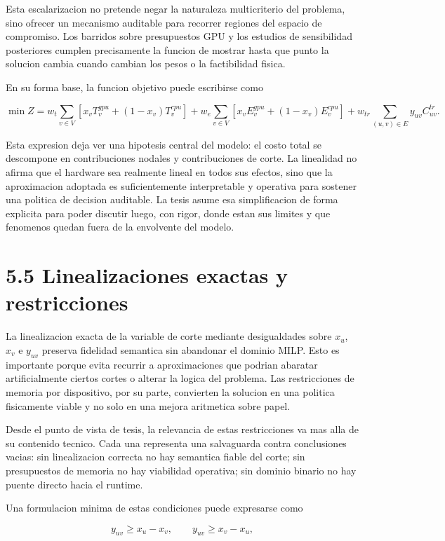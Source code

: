 Esta escalarizacion no pretende negar la naturaleza multicriterio del problema, sino ofrecer un mecanismo auditable para recorrer regiones del espacio de compromiso. Los barridos sobre presupuestos GPU y los estudios de sensibilidad posteriores cumplen precisamente la funcion de mostrar hasta que punto la solucion cambia cuando cambian los pesos o la factibilidad fisica.

En su forma base, la funcion objetivo puede escribirse como

$$
\min Z = w_t \sum_{v \in V}\left[x_v T^{gpu}_v + (1-x_v)T^{cpu}_v\right]
	+ w_e \sum_{v \in V}\left[x_v E^{gpu}_v + (1-x_v)E^{cpu}_v\right]
	+ w_{tr} \sum_{(u,v) \in E} y_{uv} C^{tr}_{uv}.
$$

Esta expresion deja ver una hipotesis central del modelo: el costo total se descompone en contribuciones nodales y contribuciones de corte. La linealidad no afirma que el hardware sea realmente lineal en todos sus efectos, sino que la aproximacion adoptada es suficientemente interpretable y operativa para sostener una politica de decision auditable. La tesis asume esa simplificacion de forma explicita para poder discutir luego, con rigor, donde estan sus limites y que fenomenos quedan fuera de la envolvente del modelo.

\section{5.5 Linealizaciones exactas y restricciones}
La linealizacion exacta de la variable de corte mediante desigualdades sobre $x_u$, $x_v$ e $y_{uv}$ preserva fidelidad semantica sin abandonar el dominio MILP. Esto es importante porque evita recurrir a aproximaciones que podrian abaratar artificialmente ciertos cortes o alterar la logica del problema. Las restricciones de memoria por dispositivo, por su parte, convierten la solucion en una politica fisicamente viable y no solo en una mejora aritmetica sobre papel.

Desde el punto de vista de tesis, la relevancia de estas restricciones va mas alla de su contenido tecnico. Cada una representa una salvaguarda contra conclusiones vacias: sin linealizacion correcta no hay semantica fiable del corte; sin presupuestos de memoria no hay viabilidad operativa; sin dominio binario no hay puente directo hacia el runtime.

Una formulacion minima de estas condiciones puede expresarse como

$$
y_{uv} \ge x_u - x_v, \qquad
y_{uv} \ge x_v - x_u,
$$

